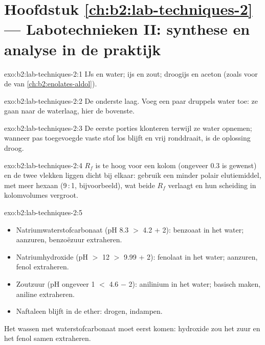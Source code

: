 \section*{Hoofdstuk \ref{ch:b2:lab-techniques-2} --- Labotechnieken II: synthese en analyse in de praktijk}

\begin{solution}{exo:b2:lab-techniques-2:1}
IJs en water; ijs en zout; droogijs en aceton (zoals voor de  van \cref{ch:b2:enolates-aldol}).
\end{solution}

\begin{solution}{exo:b2:lab-techniques-2:2}
De onderste laag. Voeg een paar druppels water toe: ze gaan naar de waterlaag, hier de bovenste.
\end{solution}

\begin{solution}{exo:b2:lab-techniques-2:3}
De eerste porties klonteren terwijl ze water opnemen; wanneer pas toegevoegde vaste stof los blijft en vrij ronddraait,
is de oplossing droog.
\end{solution}

\begin{solution}{exo:b2:lab-techniques-2:4}
$R_f$ is te hoog voor een kolom (ongeveer 0.3 is gewenst) en de twee vlekken liggen dicht bij elkaar: gebruik een minder polair
elutiemiddel, met meer hexaan (9\,:\,1, bijvoorbeeld), wat beide $R_f$ verlaagt en hun scheiding in
kolomvolumes vergroot.
\end{solution}

\begin{solution}{exo:b2:lab-techniques-2:5}
\begin{itemize}
  \item Natriumwaterstofcarbonaat (pH 8.3 $>$ 4.2 + 2): benzoaat in het water; aanzuren, benzoëzuur extraheren.
  \item Natriumhydroxide (pH $>$ 12 $>$ 9.99 + 2): fenolaat in het water; aanzuren, fenol extraheren.
  \item Zoutzuur (pH ongeveer 1 $<$ 4.6 $-$ 2): anilinium in het water; basisch maken, aniline extraheren.
  \item Naftaleen blijft in de ether: drogen, indampen.
\end{itemize}
Het wassen met waterstofcarbonaat moet eerst komen: hydroxide zou het zuur en het fenol samen extraheren.
\end{solution}

